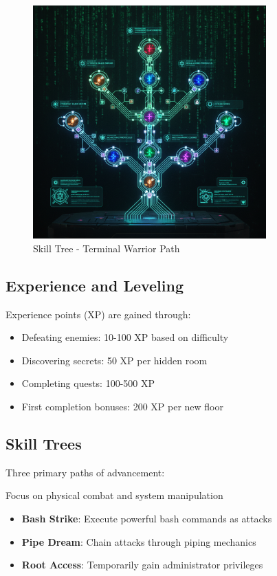 \documentclass[11pt,a4paper]{book}
\begin{document}
\begin{figure}[H]
    \centering
    \includegraphics[width=0.8\textwidth]{images/skill-tree.png}
    \caption{Skill Tree - Terminal Warrior Path}
\end{figure}

\subsection{Experience and Leveling}

Experience points (XP) are gained through:
\begin{itemize}
    \item Defeating enemies: 10-100 XP based on difficulty
    \item Discovering secrets: 50 XP per hidden room
    \item Completing quests: 100-500 XP
    \item First completion bonuses: 200 XP per new floor
\end{itemize}

\subsection{Skill Trees}

Three primary paths of advancement:

\begin{mechanicsbox}
Focus on physical combat and system manipulation
\begin{itemize}
    \item \textbf{Bash Strike}: Execute powerful bash commands as attacks
    \item \textbf{Pipe Dream}: Chain attacks through piping mechanics
    \item \textbf{Root Access}: Temporarily gain administrator privileges
\end{itemize}
\end{mechanicsbox}
\end{document}
